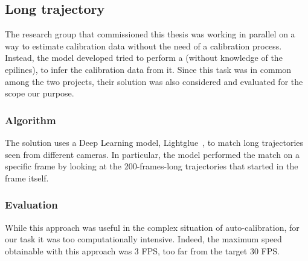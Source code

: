 \subsection{Long trajectory}
\label{sec:match:traj}

The research group that commissioned this thesis was working in parallel on a way to estimate calibration data without the need of a calibration process.
Instead, the model developed tried to perform a \match* (without knowledge of the epilines), to infer the calibration data from it.
Since this task was in common among the two projects, their solution was also considered and evaluated for the scope our purpose.

\subsubsection{Algorithm}

The solution uses a Deep Learning model, Lightglue~\cite{lightglue}, to match long trajectories seen from different cameras.
In particular, the model performed the match on a specific frame by looking at the 200-frames-long trajectories that started in the frame itself.

\subsubsection{Evaluation}

While this approach was useful in the complex situation of auto-calibration, for our task it was too computationally intensive.
Indeed, the maximum speed obtainable with this approach was 3 FPS, too far from the target 30 FPS.
